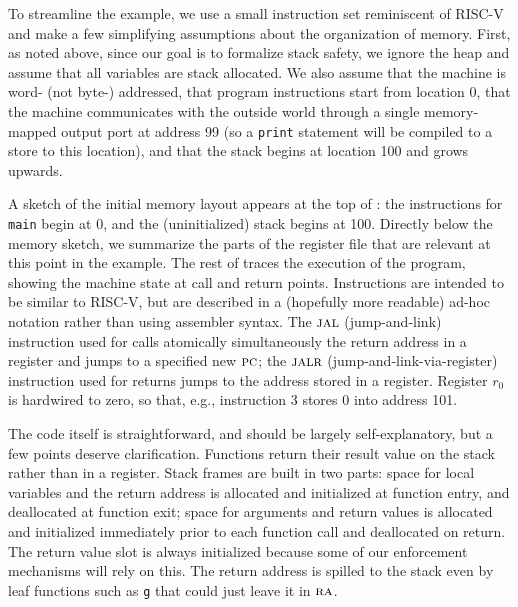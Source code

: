 \documentclass[acmsmall,review,anonymous]{acmart}\settopmatter{printfolios=true,printccs=false,printacmref=false}
\begin{document}
To streamline the example, we use a small instruction set reminiscent of
RISC-V and make a few simplifying assumptions about the organization of
memory.
%
First, as noted above, since our goal is to formalize stack safety, we
ignore the heap
and assume that all variables are stack allocated.
%
We also assume that the machine is word- (not byte-) addressed, that program
instructions start from location 0, that the machine communicates with the
outside world through a single memory-mapped output port at address 99 (so
a {\tt print} statement will be compiled to a store to this
location), and that the stack begins at location 100 and grows upwards.

A sketch of the initial memory layout appears at the top of
: the instructions for {\tt main} begin at 0,
and the (uninitialized)
stack begins at 100. Directly below the memory sketch, we summarize the parts
of the register file that are relevant at this point in the example.
%
The rest of  traces the execution of the
program, showing the machine state at call and return points.
Instructions are intended to
be similar to RISC-V, but are described in a (hopefully more readable)
ad-hoc notation
rather than using assembler syntax. The $\textsc{jal}$ (jump-and-link)
instruction used for calls atomically simultaneously the return address in a
register
and jumps to a specified new $\textsc{pc}$; the $\textsc{jalr}$ (jump-and-link-via-register)
instruction used for returns jumps to the address stored in a register.
Register $r_0$ is hardwired to zero, so that, e.g., instruction 3 stores $0$
into address 101.

The code itself is straightforward, and should be largely self-explanatory, but
a few points deserve clarification. Functions return their result value on the
stack rather than in a register.  Stack frames are built in two parts:
space for local variables and the return address is allocated and initialized at function entry, and deallocated at function exit; space for arguments and return values is allocated and initialized immediately prior to each function call and deallocated on return. The return value slot is always initialized
because some of our enforcement mechanisms will rely on this.
The return address is spilled to the stack even by leaf functions such as
{\tt g} that could just leave it in $\textsc{ra}$. 

\end{document}
